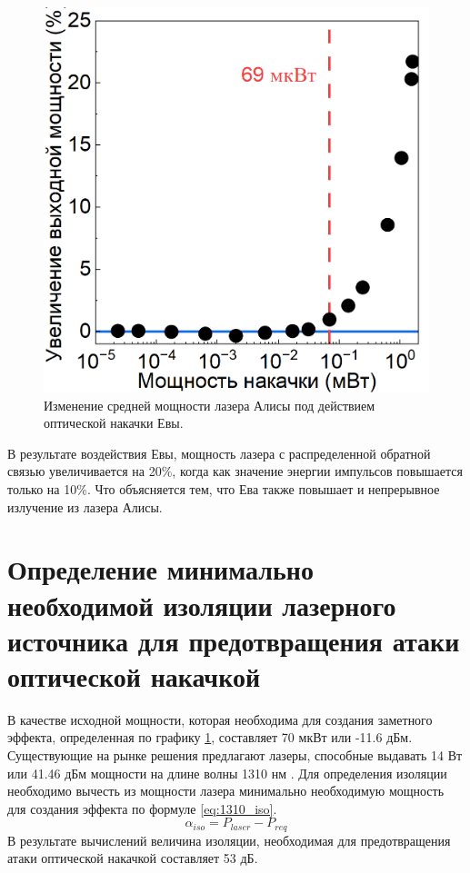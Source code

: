 \begin{figure}
    \centering
    \includegraphics{images/1310_мощность.png}
    \caption{Изменение средней мощности лазера Алисы под действием оптической накачки Евы.}
    \label{fig:avg pwr 1310 ch4}
\end{figure}
В результате воздействия Евы, мощность лазера с распределенной обратной связью увеличивается на 20\%, когда как значение энергии импульсов повышается только на 10\%. Что объясняется тем, что Ева также повышает и непрерывное излучение из лазера Алисы.
\section{Определение минимально необходимой изоляции лазерного источника для предотвращения атаки оптической накачкой}\label{sec:ch4/sect5}
В качестве исходной мощности, которая необходима для создания заметного эффекта, определенная по графику \ref{fig:avg pwr 1310 ch4}, составляет 70 мкВт или -11.6 дБм. Существующие на рынке решения предлагают лазеры, способные выдавать 14 Вт или 41.46 дБм мощности на длине волны 1310 нм \cite{grimes2022}.
Для определения изоляции необходимо вычесть из мощности лазера минимально необходимую мощность для создания эффекта по формуле \ref{eq:1310_iso}.
\begin{equation}
\label{eq:1310_iso}
    \alpha_{iso} = P_{laser} - P_{req}
\end{equation}
В результате вычислений величина изоляции, необходимая для предотвращения атаки оптической накачкой составляет 53 дБ. 

